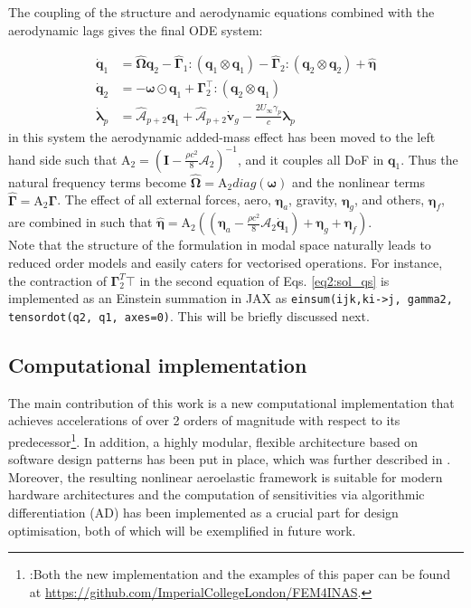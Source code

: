 \documentclass[11pt]{article}
\begin{document}
The coupling of the structure and aerodynamic equations combined with the aerodynamic lags gives the final ODE system: 

\begin{equation}
\label{eq2:sol_qs}
\begin{split}
\dot{\pmb{q}}_{1} &=  \hat{\pmb{\Omega}}  \pmb{q}_{2} - \hat{\pmb{\Gamma}}_{1} \pmb{:} \left(\pmb{q}_{1} \otimes \pmb{q}_{1} \right) - \hat{\pmb{\Gamma}}_{2} \pmb{:} \left( \pmb{q}_{2} \otimes  \pmb{q}_{2} \right) + \hat{\bm{\eta}}  \\
\dot{\pmb{q}}_{2} &= -\pmb{\omega} \odot \pmb{q}_{1} + \pmb{\Gamma}_{2}^{\top} \pmb{:} \left( \pmb{q}_{2} \otimes  \pmb{q}_{1} \right) \\
\dot{\bm{\lambda}}_{p} &= \hat{\bm{\mathcal{A}}}_{p+2}\pmb{q}_{1}
                       + \hat{\bm{\mathcal{A}}}_{p+2}\dot{\pmb{v}}_g
                       -\frac{2U_\infty\gamma_p}{c}\bm{\lambda}_{p}
\end{split}
\end{equation}
in this system the aerodynamic added-mass effect has been moved to the left hand side such that \(\bm{\mathrm{A}}_2 = (\pmb{I} - \frac{\rho c^2}{8}\pmb{\mathcal{A}}_2)^{-1}\), and it couples all DoF in \(\pmb q_1\). Thus the natural frequency terms become \(\hat{\pmb{\Omega}} = \bm{\mathrm{A}}_2 diag(\pmb{\omega})\) and the nonlinear terms \(\hat{\pmb{\Gamma}} = \bm{\mathrm{A}}_2 \bm{\Gamma}\). The effect of all external forces, aero, \(\bm{\eta}_a\), gravity, \(\bm{\eta}_g\), and others, \(\bm{\eta}_f\), are combined in such that \(\hat{\bm{\eta}} = \bm{\mathrm{A}}_2 \left( \left( \bm{\eta}_a - \frac{\rho c^2}{8} \pmb{\mathcal{A}}_2\dot{\bm{q}}_1 \right) +  \bm{\eta}_g + \bm{\eta}_f \right)\). \\
Note that the structure of the formulation in modal space naturally leads to reduced order models and easily caters for vectorised operations. For instance, the contraction of \(\bm \Gamma_2^T{\top}\) in the second equation of Eqs. \ref{eq2:sol_qs} is implemented as an Einstein summation in JAX as \texttt{einsum(ijk,ki->j, gamma2, tensordot(q2, q1, axes=0)}. This will be briefly discussed next. 
\subsection{Computational implementation}
\label{sec:org7909629}
The main contribution of this work is a new computational implementation that achieves accelerations of over 2 orders of magnitude with respect to its predecessor\footnote{:Both the new implementation and the examples of this paper can be found at \url{https://github.com/ImperialCollegeLondon/FEM4INAS}.}. In addition, a highly modular, flexible architecture based on software design patterns has been put in place, which was further described in \cite{CEA2024}. Moreover, the resulting nonlinear aeroelastic framework is suitable for modern hardware architectures and the computation of sensitivities via algorithmic differentiation (AD) has been implemented as a crucial part for design optimisation, both of which will be exemplified in future work.
\end{document}
